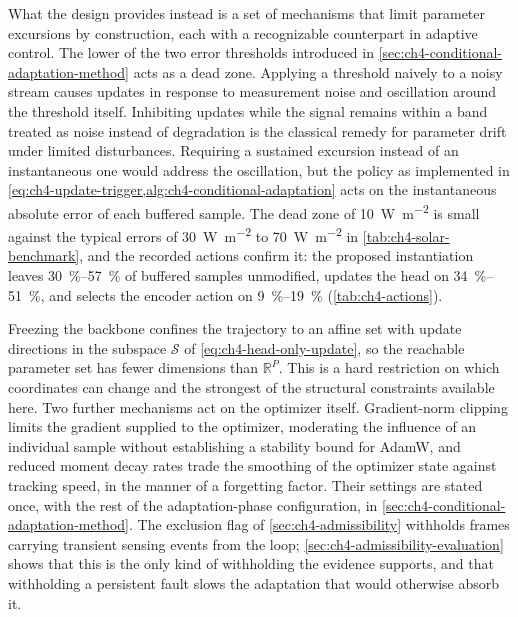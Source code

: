 What the design provides instead is a set of mechanisms that limit parameter excursions by construction, each with a recognizable counterpart in adaptive control. The lower of the two error thresholds introduced in \cref{sec:ch4-conditional-adaptation-method} acts as a dead zone. Applying a threshold naively to a noisy stream causes updates in response to measurement noise and oscillation around the threshold itself. Inhibiting updates while the signal remains within a band treated as noise instead of degradation is the classical remedy for parameter drift under limited disturbances. Requiring a sustained excursion instead of an instantaneous one would address the oscillation, but the policy as implemented in \cref{eq:ch4-update-trigger,alg:ch4-conditional-adaptation} acts on the instantaneous absolute error of each buffered sample. The dead zone of \SI{10}{\watt\per\square\meter} is small against the typical errors of \SI{30}{\watt\per\square\meter} to \SI{70}{\watt\per\square\meter} in \cref{tab:ch4-solar-benchmark}, and the recorded actions confirm it: the proposed instantiation leaves \SIrange{30}{57}{\percent} of buffered samples unmodified, updates the head on \SIrange{34}{51}{\percent}, and selects the encoder action on \SIrange{9}{19}{\percent} (\cref{tab:ch4-actions}).

Freezing the backbone confines the trajectory to an affine set with update directions in the subspace $\mathcal{S}$ of \cref{eq:ch4-head-only-update}, so the reachable parameter set has fewer dimensions than $\mathbb{R}^{P}$. This is a hard restriction on which coordinates can change and the strongest of the structural constraints available here. Two further mechanisms act on the optimizer itself. Gradient-norm clipping limits the gradient supplied to the optimizer, moderating the influence of an individual sample without establishing a stability bound for AdamW, and reduced moment decay rates trade the smoothing of the optimizer state against tracking speed, in the manner of a forgetting factor. Their settings are stated once, with the rest of the adaptation-phase configuration, in \cref{sec:ch4-conditional-adaptation-method}. The exclusion flag of \cref{sec:ch4-admissibility} withholds frames carrying transient sensing events from the loop; \cref{sec:ch4-admissibility-evaluation} shows that this is the only kind of withholding the evidence supports, and that withholding a persistent fault slows the adaptation that would otherwise absorb it.


